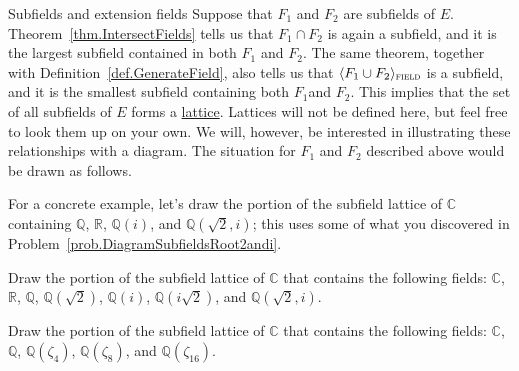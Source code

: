 \begin{section}{Subfields and extension fields}
Suppose that $F_1$ and $F_2$ are subfields of $E$. Theorem~\ref{thm.IntersectFields} tells us that $F_1\cap F_2$ is again a subfield, and it is the largest subfield contained in both $F_1$ and $F_2$. The same theorem, together with Definition~\ref{def.GenerateField}, also tells us that $\langle F_1\cup F_2 \rangle_{\textsc{field}}$ is a subfield, and it is the smallest subfield containing both $F_1$and $F_2$. This implies that the set of all subfields of $E$ forms a \href{https://en.wikipedia.org/wiki/Lattice_(order)}{lattice}. Lattices will not be defined here, but feel free to look them up on your own. We will, however, be interested in illustrating these relationships with a diagram. The situation for $F_1$ and $F_2$ described above would be drawn as follows.
\begin{center}
\end{center}

For a concrete example, let's draw the portion of the subfield lattice of $\mathbb{C}$ containing $\mathbb{Q}$, $\mathbb{R}$, $\mathbb{Q}(i)$, and $\mathbb{Q}\left(\sqrt{2},i\right)$; this uses some of what you discovered in Problem~\ref{prob.DiagramSubfieldsRoot2andi}.

\begin{center}
\end{center}

\begin{problem}\label{prob.LatticeSubfieldsRoot2andi}
Draw the portion of the subfield lattice of $\mathbb{C}$ that contains the following fields:
$\mathbb{C}$, $\mathbb{R}$, $\mathbb{Q}$, $\mathbb{Q}\left(\sqrt{2}\right)$, $\mathbb{Q}(i)$, $\mathbb{Q}\left(i\sqrt{2}\right)$, and $\mathbb{Q}\left(\sqrt{2},i\right)$.
\end{problem}

\begin{problem}
Draw the portion of the subfield lattice of $\mathbb{C}$ that contains the following fields:
$\mathbb{C}$, $\mathbb{Q}$, $\mathbb{Q}(\zeta_4)$, $\mathbb{Q}(\zeta_8)$, and $\mathbb{Q}(\zeta_{16})$.
\end{problem}
\end{section}




